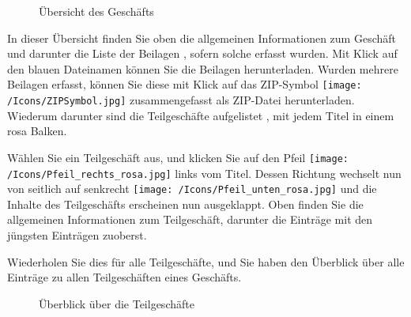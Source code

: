 \begin{figure}[H]
\caption{Übersicht des Geschäfts}
\end{figure}

In dieser Übersicht finden Sie oben die allgemeinen Informationen zum Geschäft  und darunter die Liste der Beilagen , sofern solche erfasst wurden. Mit Klick auf den blauen Dateinamen können Sie die Beilagen herunterladen. Wurden mehrere Beilagen erfasst, können Sie diese mit Klick auf das ZIP-Symbol \texttt{[image: /Icons/ZIPSymbol.jpg]}  zusammengefasst als ZIP-Datei herunterladen. Wiederum darunter sind die Teilgeschäfte aufgelistet , mit jedem Titel in einem rosa Balken.

\vspace{\baselineskip}

Wählen Sie ein Teilgeschäft aus, und klicken Sie auf den Pfeil \texttt{[image: /Icons/Pfeil\_rechts\_rosa.jpg]} links vom Titel. Dessen Richtung wechselt nun von seitlich auf senkrecht \texttt{[image: /Icons/Pfeil\_unten\_rosa.jpg]} und die Inhalte des Teilgeschäfts erscheinen nun ausgeklappt. Oben finden Sie die allgemeinen Informationen zum Teilgeschäft, darunter die Einträge mit den jüngsten Einträgen zuoberst.

\vspace{\baselineskip}

Wiederholen Sie dies für alle Teilgeschäfte, und Sie haben den Überblick über alle Einträge zu allen Teilgeschäften eines Geschäfts.

\begin{figure}[H]
\caption{Überblick über die Teilgeschäfte}
\end{figure}

